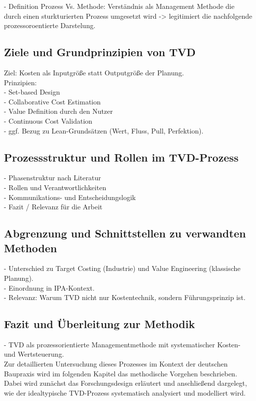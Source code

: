 - Definition Prozess Vs. Methode: Verständnis als Management Methode die durch einen sturkturierten Prozess umgesetzt wird -> legitimiert die nachfolgende prozessoroentierte Darstelung.\\

\subsection{Ziele und Grundprinzipien von TVD}
\label{sec: 2.3.2}

Ziel: Kosten als Inputgröße statt Outputgröße der Planung.\\

Prinzipien:\\
- Set-based Design\\
- Collaborative Cost Estimation\\
- Value Definition durch den Nutzer\\
- Continuous Cost Validation\\
- ggf. Bezug zu Lean-Grundsätzen (Wert, Fluss, Pull, Perfektion).\\

\subsection{Prozessstruktur und Rollen im TVD-Prozess}
\label{sec: 2.3.3}

- Phasenstruktur nach Literatur\\
- Rollen und Verantwortlichkeiten\\
- Kommunikations- und Entscheidungslogik\\
- Fazit / Relevanz für die Arbeit\\

\subsection{Abgrenzung und Schnittstellen zu verwandten Methoden}
\label{sec: 2.3.4}

- Unterschied zu Target Costing (Industrie) und Value Engineering (klassische Planung).\\

- Einordnung in IPA-Kontext.\\

- Relevanz: Warum TVD nicht nur Kostentechnik, sondern Führungsprinzip ist.\\

\subsection{Fazit und Überleitung zur Methodik}
\label{sec: 2.3.5}
- TVD als prozessorientierte Managementmethode mit systematischer Kosten- und Wertsteuerung.\\

Zur detaillierten Untersuchung dieses Prozesses im Kontext der deutschen Baupraxis wird im folgenden Kapitel das methodische Vorgehen beschrieben. Dabei wird zunächst das Forschungsdesign erläutert und anschließend dargelegt, wie der idealtypische TVD-Prozess systematisch analysiert und modelliert wird.

\clearpage